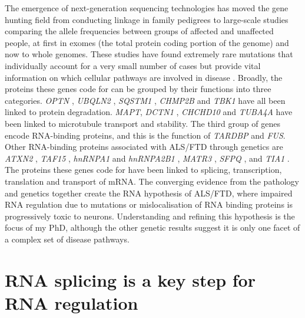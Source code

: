 The emergence of next-generation sequencing technologies has moved the gene hunting field from conducting linkage in family pedigrees to large-scale studies comparing the allele frequencies between groups of affected and unaffected people, at first in exomes (the total protein coding portion of the genome) and now to whole genomes. 
These studies have found extremely rare mutations that individually account for a very small number of cases but provide vital information on which cellular pathways are involved in disease  \citep{Taylor2016,Pottier2016}.
Broadly, the proteins these genes code for can be grouped by their functions into three categories. 
\textit{OPTN} \citep{Maruyama2010} , \textit{UBQLN2} \citep{Deng2011}, \textit{SQSTM1} \citep{Fecto2011}, \textit{CHMP2B} \citep{Skibinski2005} and \textit{TBK1} \citep{Cirulli2015,Freischmidt2015} have all been linked to protein degradation. 
\textit{MAPT}, \textit{DCTN1} \citep{Puls2003} , \textit{CHCHD10} \citep{Bannwarth2014} and \textit{TUBA4A} \citep{Smith2014} have been linked to microtubule transport and stability. 
The third group of genes encode RNA-binding proteins, and this is the function of \textit{TARDBP} and \textit{FUS}. 
Other RNA-binding proteins associated with ALS/FTD through genetics are \textit{ATXN2} \citep{Elden2010}, \textit{TAF15} \citep{Ticozzi2011}, \textit{hnRNPA1} and \textit{hnRNPA2B1} \citep{Kim2013}, \textit{MATR3} \citep{Johnson2014}, \textit{SFPQ} \citep{Thomas-Jinu2017}, and \textit{TIA1} \citep{Mackenzie2017}. 
The proteins these genes code for have been linked to splicing, transcription, translation and transport of mRNA. 
The converging evidence from the pathology and genetics together create the RNA hypothesis of ALS/FTD, where impaired RNA regulation due to mutations or mislocalisation of RNA binding proteins is progressively toxic to neurons. 
Understanding and refining this hypothesis is the focus of my PhD, although the other genetic results suggest it is only one facet of a complex set of disease pathways. 

\section{RNA splicing is a key step for RNA regulation}


